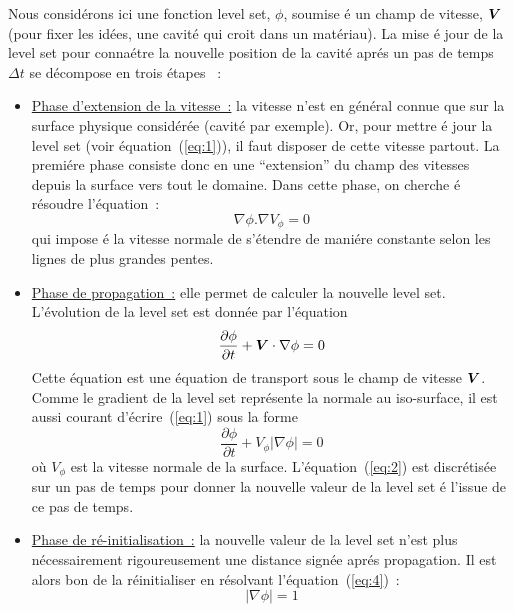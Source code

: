 Nous consid\'erons ici une fonction level set, $\phi$,
soumise \'e un champ de
vitesse, $\mbox{\boldmath $V$}$ (pour fixer les id\'ees, une cavit\'e qui croit dans un
mat\'eriau).
La mise \'e jour de la level set pour conna\'etre la nouvelle
position de la cavit\'e apr\'es un pas de temps $\Delta t$ se d\'ecompose en
trois \'etapes \cite{Sethian:book}~:
\begin{itemize}
\item \underline{Phase d'extension de la vitesse~:} la vitesse n'est en
    g\'en\'eral connue que sur la surface physique consid\'er\'ee
    (cavit\'e par exemple). Or, pour mettre \'e jour
    la level set (voir \'equation~(\ref{eq:1})), il
    faut disposer de cette vitesse partout. La premi\'ere phase
    consiste donc en une ``extension'' du champ des vitesses
    depuis la surface vers tout le domaine.
    Dans cette phase, on cherche \'e r\'esoudre  l'\'equation~:
    \begin{equation}
    \nabla\phi.\nabla V_{\phi}=0
    \label{eq:3}
    \end{equation}
    qui impose \'e la vitesse normale de s'\'etendre de mani\'ere
    constante selon les lignes de plus grandes pentes.

\item \underline{Phase de propagation~:} elle permet de
    calculer la nouvelle level set. L'\'evolution de la level set
    est donn\'ee par l'\'equation
    \begin{equation}
        \frac{\partial\phi}{\partial t}+\mbox{\boldmath $V$} \cdot  \nabla\phi  = 0
        \label{eq:1}
    \end{equation}
    Cette \'equation est une \'equation de transport sous le champ
    de vitesse $\mbox{\boldmath $V$}$.
    Comme le gradient de la level set repr\'esente la normale au iso-surface,
    il est aussi courant d'\'ecrire~(\ref{eq:1}) sous la forme
    \begin{equation}
        \frac{\partial\phi}{\partial t}+V_{\phi}\left|\nabla\phi\right|=0
        \label{eq:2}
    \end{equation}
    o\`u $V_{\phi}$ est la vitesse normale de la surface.
    L'\'equation~(\ref{eq:2}) est discr\'etis\'ee sur un pas
    de temps pour donner la nouvelle valeur
    de la level set \'e l'issue de ce pas de temps.
\item \underline{Phase de r\'e-initialisation~:} la nouvelle valeur de la
    level set
    n'est plus n\'ecessairement rigoureusement
    une distance sign\'ee apr\'es propagation.
    Il est alors bon de la
    r\'e\-initia\-liser en r\'esolvant l'\'equation~(\ref{eq:4})~:
    \begin{equation}
        \left|\nabla\phi\right|=1
        \label{eq:4}
    \end{equation}
\end{itemize}


